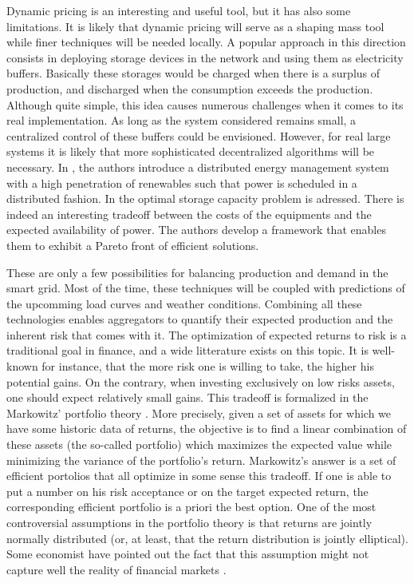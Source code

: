 \documentclass[conference]{IEEEtran}
\begin{document}
Dynamic pricing is an interesting and useful tool, but it has also some limitations. It is likely that dynamic pricing will serve as a shaping mass tool while finer techniques will be needed locally. A popular approach in this direction consists in deploying storage devices in the network and using them as electricity buffers. Basically these storages would be charged when there is a surplus of production, and discharged when the consumption exceeds the production. Although quite simple, this idea causes numerous challenges when it comes to its real implementation. As long as the system considered remains small, a centralized control of these buffers could be envisioned. However, for real large systems it is likely that more sophisticated decentralized algorithms will be necessary. In \cite{Zhang2013}, the authors introduce a distributed energy management system with a high penetration of renewables such that power is scheduled in a distributed fashion. In \cite{Shadmand2014} the optimal storage capacity problem is adressed. There is indeed an interesting tradeoff between the costs of the equipments and the expected availability of power. The authors develop a framework that enables them to exhibit a Pareto front of efficient solutions.

These are only a few possibilities for balancing production and demand in the smart grid. Most of the time, these techniques will be coupled with predictions of the upcomming load curves and weather conditions. Combining all these technologies enables aggregators to quantify their expected production and the inherent risk that comes with it. The optimization of expected returns to risk is a traditional goal in finance, and a wide litterature exists on this topic. It is well-known for instance, that the more risk one is willing to take, the higher his potential gains. On the contrary, when investing exclusively on low risks assets, one should expect relatively small gains. This tradeoff is formalized in the Markowitz' portfolio theory \cite{Markowitz1959}. More precisely, given a set of assets for which we have some historic data of returns, the objective is to find a linear combination of these assets (the so-called portfolio) which maximizes the expected value while minimizing the variance of the portfolio's return. Markowitz's answer is a set of efficient portolios that all optimize in some sense this tradeoff. If one is able to put a number on his risk acceptance or on the target expected return, the corresponding efficient portfolio is a priori the best option. One of the most controversial assumptions in the portfolio theory is that returns are jointly normally distributed (or, at least, that the return distribution is jointly elliptical). Some economist have pointed out the fact that this assumption might not capture well the reality of financial markets \cite{Chicheportiche2010}.
\end{document}
